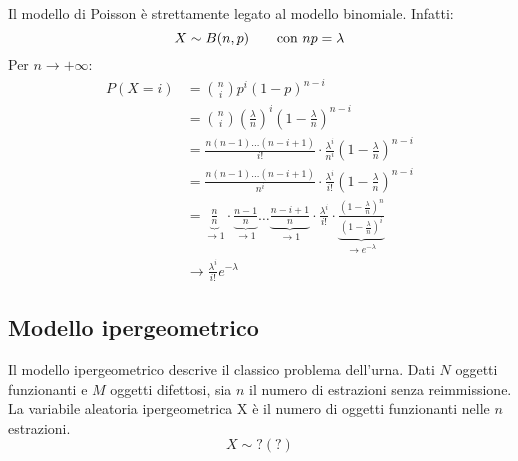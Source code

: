 Il modello di Poisson è strettamente legato al modello binomiale. Infatti:
\begin{equation*}
	X\sim B(n, p)\qquad\text{con }np=\lambda \\
\end{equation*}
Per $n\to+\infty$:
\begin{align*}
	P(X=i) & = \binom{n}{i} p^i (1-p)^{n-i}                                                                                                                                                                                                                                                \\
	       & = \binom{n}{i}\left(\frac{\lambda}{n}\right)^i\left(1-\frac{\lambda}{n}\right)^{n-i}                                                                                                                                                                                          \\
	       & = \frac{n(n-1) \dots (n-i+1)}{i!} \cdot \frac{\lambda^i}{n^i} \left( 1 - \frac{\lambda}{n} \right)^{n-i}                                                                                                                                                                      \\
	       & = \frac{n(n-1) \dots (n-i+1)}{n^i} \cdot \frac{\lambda^i}{i!} \left( 1 - \frac{\lambda}{n} \right)^{n-i}                                                                                                                                                                      \\
	       & = \underbrace{\frac{n}{n}}_{\to 1} \cdot \underbrace{\frac{n-1}{n}}_{\to 1} \dots \underbrace{\frac{n-i+1}{n}}_{\to 1} \cdot \frac{\lambda^i}{i!} \cdot \underbrace{\frac{\left( 1 - \frac{\lambda}{n} \right)^n}{\left( 1 - \frac{\lambda}{n} \right)^i}}_{\to e^{-\lambda}} \\
	       & \to \frac{\lambda^i}{i!} e^{-\lambda}
\end{align*}



\subsection{Modello ipergeometrico}
Il modello ipergeometrico descrive il classico problema dell'urna. Dati $N$ oggetti funzionanti e $M$ oggetti difettosi, sia $n$ il numero di estrazioni senza reimmissione. La variabile aleatoria ipergeometrica X è il numero di oggetti funzionanti nelle $n$ estrazioni.
\begin{equation*}
	X\sim ?(?)
\end{equation*}

